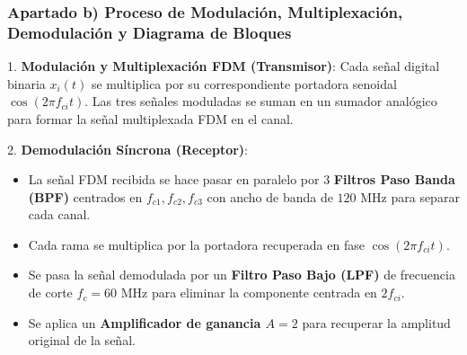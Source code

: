 \begin{resolucion}
\subsubsection*{Apartado b) Proceso de Modulación, Multiplexación, Demodulación y Diagrama de Bloques}

1. \textbf{Modulación y Multiplexación FDM (Transmisor)}:
   Cada señal digital binaria $x_i(t)$ se multiplica por su correspondiente portadora senoidal $\cos(2\pi f_{ci} t)$. Las tres señales moduladas se suman en un sumador analógico para formar la señal multiplexada FDM en el canal.

2. \textbf{Demodulación Síncrona (Receptor)}:
   \begin{itemize}
       \item La señal FDM recibida se hace pasar en paralelo por 3 \textbf{Filtros Paso Banda (BPF)} centrados en $f_{c1}, f_{c2}, f_{c3}$ con ancho de banda de $120$ MHz para separar cada canal.
       \item Cada rama se multiplica por la portadora recuperada en fase $\cos(2\pi f_{ci} t)$.
       \item Se pasa la señal demodulada por un \textbf{Filtro Paso Bajo (LPF)} de frecuencia de corte $f_c = 60$ MHz para eliminar la componente centrada en $2f_{ci}$.
       \item Se aplica un \textbf{Amplificador de ganancia $A=2$} para recuperar la amplitud original de la señal.
   \end{itemize}

\begin{center}
\end{center}
\end{resolucion}













